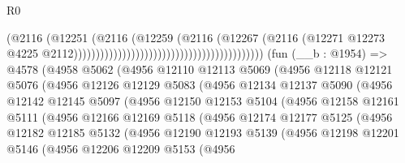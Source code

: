 \begin{lexlean}{R0}
\begin{coremodule}
                                                                          (@2116
                                                                            (@12251
                                                                              (@2116
                                                                                (@12259
                                                                                  (@2116
                                                                                    (@12267
                                                                                      (@2116
                                                                                        (@12271
                                                                                          @12273
                                                                                          @4225
                                                                                          @2112)))))))))))))))))))))))))))))))))))))))))))
    (fun (__b : @1954) =>
    @4578
      (@4958
        @5062
        (@4956
          @12110
          @12113
          @5069
          (@4956
            @12118
            @12121
            @5076
            (@4956
              @12126
              @12129
              @5083
              (@4956
                @12134
                @12137
                @5090
                (@4956
                  @12142
                  @12145
                  @5097
                  (@4956
                    @12150
                    @12153
                    @5104
                    (@4956
                      @12158
                      @12161
                      @5111
                      (@4956
                        @12166
                        @12169
                        @5118
                        (@4956
                          @12174
                          @12177
                          @5125
                          (@4956
                            @12182
                            @12185
                            @5132
                            (@4956
                              @12190
                              @12193
                              @5139
                              (@4956
                                @12198
                                @12201
                                @5146
                                (@4956
                                  @12206
                                  @12209
                                  @5153
                                  (@4956

\end{coremodule}
\end{lexlean}
